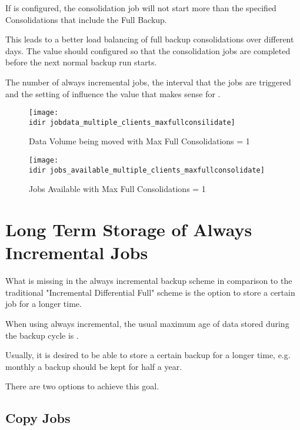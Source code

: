 If  is configured,
the consolidation job will not start more than the specified Consolidations that include the Full Backup.

This leads to a better load balancing of full backup consolidations over different days. 
The value should configured so that the consolidation jobs are completed before the next normal backup run starts.

The number of always incremental jobs, the interval that the jobs are triggered
and the setting of  influence the value
that makes sense for .

\begin{figure}[htbp]
\centering
\texttt{[image: \\idir jobdata\_multiple\_clients\_maxfullconsilidate]}
\caption{Data Volume being moved with Max Full Consolidations = 1}%
\end{figure}%

\begin{figure}[htbp]
\centering
\texttt{[image: \\idir jobs\_available\_multiple\_clients\_maxfullconsolidate]}
\caption{Jobs Available with Max Full Consolidations = 1}%
\end{figure}%


\section{Long Term Storage of Always Incremental Jobs}
\label{sec:AlwaysIncrementalLongTermStorage}

What is missing in the always incremental backup scheme in comparison to the traditional "Incremental Differential Full" scheme is the option to store a certain job for a longer time.

When using always incremental, the usual maximum age of data stored during the backup cycle is .

Usually, it is desired to be able to store a certain backup for a longer time, e.g. monthly a backup should be kept for half a year.

There are two options to achieve this goal.

\subsection{Copy Jobs}

